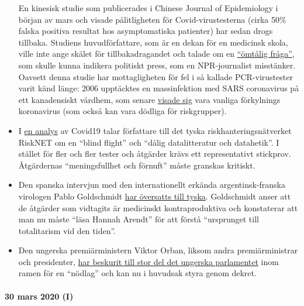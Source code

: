 \begin{itemize}
  En kinesisk studie som publicerades i Chinese Journal of Epidemiology
  i början av mars och visade pålitligheten för Covid-virustesterna
  (cirka 50\% falska positiva resultat hos asymptomatiska patienter) har
  sedan drogs tillbaka. Studiens huvudförfattare, som är en dekan för en
  medicinsk skola, ville inte ange skälet för tillbakadragandet och
  talade om en
  \href{https://www.npr.org/sections/health-shots/2020/03/26/822084429/in-defense-of-coronavirus-testing-strategy-administration-cited-retracted-study}{``ömtålig
  fråga''}, som skulle kunna indikera politiskt press, som en
  NPR-journalist misstänker. Oavsett denna studie har mottagligheten för
  fel i så kallade PCR-virustester varit känd länge: 2006 upptäcktes en
  massinfektion med SARS coronavirus på ett kanadensiskt vårdhem, som
  senare
  \href{https://www.ncbi.nlm.nih.gov/pmc/articles/PMC2095096/}{visade
  sig} vara vanliga förkylnings koronavirus (som också kan vara dödliga
  för riskgrupper).
\item
  I
  \href{https://www.risknet.de/themen/risknews/covid-19-und-der-blindflug/}{en
  analys} av Covid19 talar författare till det tyska
  riskhanteringsnätverket RiskNET om en ``blind flight'' och ``dålig
  datalitteratur och datahetik''. I stället för fler och fler tester och
  åtgärder krävs ett representativt stickprov. Åtgärdernas
  ``meningsfullhet och förnuft'' måste granskas kritiskt.
\item
  Den spanska intervjun med den internationellt erkända
  argentinsk-franska virologen Pablo Goldschmidt
  \href{https://www.rubikon.news/artikel/der-corona-totalitarismus}{har
  översatts till tyska}. Goldschmidt anser att de åtgärder som vidtagits
  är medicinskt kontraproduktiva och konstaterar att man nu måste ``läsa
  Hannah Arendt'' för att förstå ``ursprunget till totalitarism vid den
  tiden''.
\item
  Den ungerska premiärministern Viktor Orban, liksom andra
  premiärministrar och presidenter,
  \href{https://www.krone.at/2127086}{har beskurit till stor del det
  ungerska parlamentet} inom ramen för en ``nödlag'' och kan nu i
  huvudsak styra genom dekret.
\end{itemize}

\hypertarget{30-mars-2020-i}{%
\paragraph{30 mars 2020 (I)}\label{30-mars-2020-i}}


